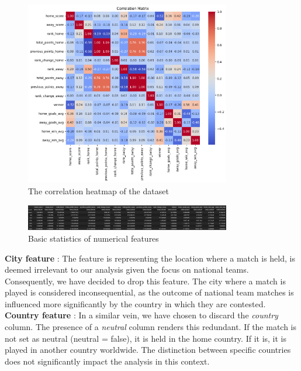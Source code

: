 \documentclass[a4paper,12pt]{article}
\begin{document}
\begin{figure}
  \centering
  \includegraphics[width=0.8\textwidth]{./images/correlation_rera.png}  %
  \caption{The correlation heatmap of the dataset}
  \label{fig:corr_hm}
\end{figure}

\begin{figure}
  \centering
  \includegraphics[width=0.8\textwidth]{./images/basic_stats_numerical_features.png}
  \caption{Basic statistics of numerical features}
  \label{fig:stats}
\end{figure}


{\bf City feature} : The feature is representing the location where a match is held, is deemed irrelevant to our analysis given the focus on national teams. Consequently, we have decided to drop this feature. The city where a match is played is considered inconsequential, as the outcome of national team matches is influenced more significantly by the country in which they are contested.\\

{\bf Country feature} : In a similar vein, we have chosen to discard the {\it country} column. The presence of a {\it neutral} column renders this redundant. If the match is not set as neutral (neutral = false), it is held in the home country. If it is, it is played in another country worldwide. The distinction between specific countries does not significantly impact the analysis in this context.\\
\end{document}
